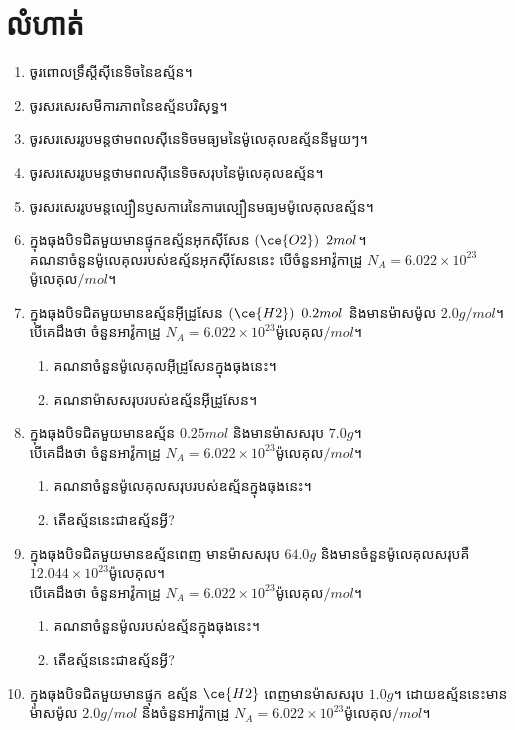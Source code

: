 \section{លំហាត់}
\begin{enumerate}[m]
	\item ចូរពោលទ្រឹស្តីសុីនេទិចនៃឧស្ម័ន។
	\item ចូរសរសេរសមីការភាពនៃឧស្ម័នបរិសុទ្ធ។
	\item ចូរសរសេររូបមន្តថាមពលសុីនេទិចមធ្យមនៃម៉ូលេគុលឧស្ម័ននីមួយៗ។
	\item ចូរសរសេររូបមន្តថាមពលសុីនេទិចសរុបនៃម៉ូលេគុលឧស្ម័ន។
	\item ចូរសរសេររូបមន្តល្បឿនប្ញសការេនៃការេល្បឿនមធ្យមម៉ូលេគុលឧស្ម័ន។
	\item ក្នុងធុងបិទជិតមួយមានផ្ទុកឧស្ម័នអុកសុីសែន $\left(\ce{O2}\right)~2mol$។\\
	គណនាចំនួនម៉ូលេគុលរបស់ឧស្ម័នអុកសុីសែននេះ បើចំនួនអាវ៉ូកាដ្រូ $N_{A}=6.022\times10^{23}$ ម៉ូលេគុល$/mol$។
	\item ក្នុងធុងបិទជិតមួយមានឧស្ម័នអុីដ្រូសែន $\left(\ce{H2}\right)~0.2mol$ និងមានម៉ាសម៉ូល $2.0g/mol$។\\
	បើគេដឹងថា ចំនួនអាវ៉ូកាដ្រូ $N_{A}=6.022\times10^{23}$ម៉ូលេគុល$/mol$។
	\begin{enumerate}[k]
		\item គណនាចំនួនម៉ូលេគុលអុីដ្រូសែនក្នុងធុងនេះ។
		\item គណនាម៉ាសសរុបរបស់ឧស្ម័នអុីដ្រូសែន។
	\end{enumerate}
	\item ក្នុងធុងបិទជិតមួយមានឧស្ម័ន $0.25mol$ និងមានម៉ាសសរុប $7.0g$។\\
	បើគេដឹងថា ចំនួនអាវ៉ូកាដ្រូ $N_{A}=6.022\times10^{23}$ម៉ូលេគុល$/mol$។
	\begin{enumerate}[k]
		\item គណនាចំនួនម៉ូលេគុលសរុបរបស់ឧស្ម័នក្នុងធុងនេះ។
		\item តើឧស្ម័ននេះជាឧស្ម័នអ្វី?
	\end{enumerate}
	\item ក្នុងធុងបិទជិតមួយមានឧស្ម័នពេញ មានម៉ាសសរុប $64.0g$ និងមានចំនួនម៉ូលេគុលសរុបគឺ $12.044\times10^{23}$ម៉ូលេគុល។\\
	បើគេដឹងថា ចំនួនអាវ៉ូកាដ្រូ $N_{A}=6.022\times10^{23}$ម៉ូលេគុល$/mol$។
	\begin{enumerate}[k]
		\item គណនាចំនួនម៉ូលរបស់ឧស្ម័នក្នុងធុងនេះ។
		\item តើឧស្ម័ននេះជាឧស្ម័នអ្វី?
	\end{enumerate}
	\item ក្នុងធុងបិទជិតមួយមានផ្ទុក ឧស្ម័ន $\ce{H2}$ ពេញមានម៉ាសសរុប $1.0g$។ ដោយឧស្ម័ននេះមានម៉ាសម៉ូល $2.0g/mol$ និងចំនួនអាវ៉ូកាដ្រូ $N_{A}=6.022\times10^{23}$ម៉ូលេគុល$/mol$។

\end{enumerate}
